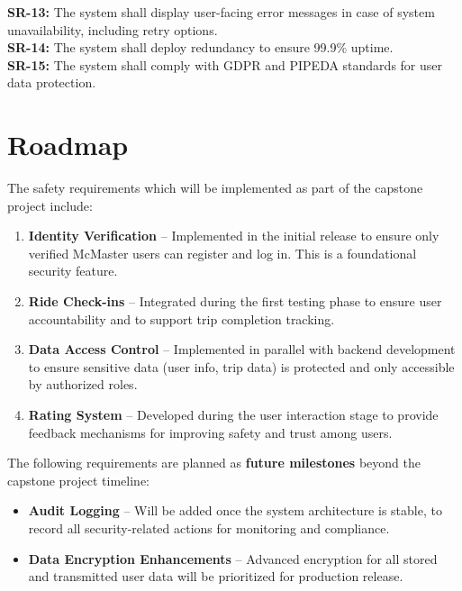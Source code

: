 \documentclass{article}
\begin{document}
\noindent \textbf{SR-13:} The system shall display user-facing error messages in case of system unavailability, including retry options. \\

\noindent \textbf{SR-14:} The system shall deploy redundancy to ensure 99.9\% uptime. \\

\noindent \textbf{SR-15:} The system shall comply with GDPR and PIPEDA standards for user data protection. \\

\section{Roadmap}

The safety requirements which will be implemented as part of the capstone project include:

\begin{enumerate}
    \item \textbf{Identity Verification} – Implemented in the initial release to ensure only verified McMaster users can register and log in. This is a foundational security feature.
    \item \textbf{Ride Check-ins} – Integrated during the first testing phase to ensure user accountability and to support trip completion tracking.
    \item \textbf{Data Access Control} – Implemented in parallel with backend development to ensure sensitive data (user info, trip data) is protected and only accessible by authorized roles.
    \item \textbf{Rating System} – Developed during the user interaction stage to provide feedback mechanisms for improving safety and trust among users.
\end{enumerate}

The following requirements are planned as \textbf{future milestones} beyond the capstone project timeline:

\begin{itemize}
    \item \textbf{Audit Logging} – Will be added once the system architecture is stable, to record all security-related actions for monitoring and compliance.
    \item \textbf{Data Encryption Enhancements} – Advanced encryption for all stored and transmitted user data will be prioritized for production release.
\end{itemize}
\end{document}

